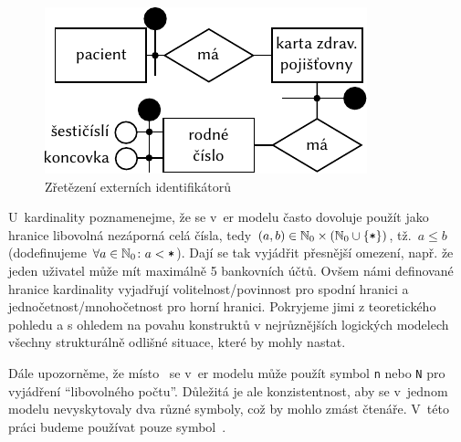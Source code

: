 \begin{figure}[!htb]
  \centering
\includegraphics[width=\maxwidth{\textwidth}]{../img/er-model/external-id-chain.pdf}
  \caption{Zřetězení externích identifikátorů}
  \label{fig:er-external-identifier-chain}
\end{figure}

U~kardinality poznamenejme, že se v~\acrshort{er} modelu často dovoluje použít jako hranice libovolná nezáporná celá čísla, tedy $(a, b)\in \mathbb N_0\times \left(\mathbb N_0 \cup \left\{\texttt{*}\right\}\right)$, tž.~$a\leq b$ (dodefinujeme $\forall a\in\mathbb N_0\colon a < \texttt{*}$).
Dají se tak vyjádřit přesnější omezení, např. že jeden uživatel může mít maximálně 5 bankovních účtů.
Ovšem námi definované hranice kardinality vyjadřují volitelnost/povinnost pro spodní hranici a jednočetnost/mnohočetnost pro horní hranici.
Pokryjeme jimi z teoretického pohledu a s ohledem na povahu konstruktů v nejrůznějších logických modelech všechny strukturálně odlišné situace, které by mohly nastat.

Dále upozorněme, že místo~\many{} se v~\acrshort{er} modelu může použít symbol \texttt{n} nebo \texttt{N} pro vyjádření \enquote{libovolného počtu}.
Důležitá je ale konzistentnost, aby se v~jednom modelu nevyskytovaly dva různé symboly, což by mohlo zmást čtenáře.
V~této práci budeme používat pouze symbol~\many{}.

